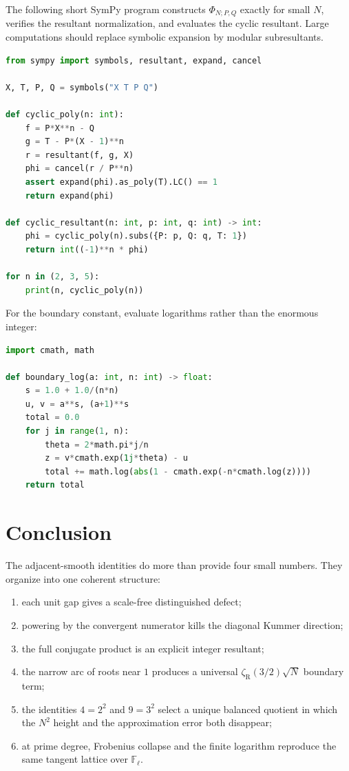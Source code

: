 \documentclass[11pt]{article}
\theoremstyle{definition}
\theoremstyle{remark}
\newcommand{\FF}{\mathbb F}
\newcommand{\zR}{\zeta_{\!\mathrm R}}
\begin{document}
The following short SymPy program constructs \(\Phi_{N;P,Q}\) exactly for small \(N\), verifies the resultant normalization, and evaluates the cyclic resultant.  Large computations should replace symbolic expansion by modular subresultants.

\begin{lstlisting}[language=Python,basicstyle=\ttfamily\small,frame=single,breaklines=true,showstringspaces=false]
from sympy import symbols, resultant, expand, cancel

X, T, P, Q = symbols("X T P Q")

def cyclic_poly(n: int):
    f = P*X**n - Q
    g = T - P*(X - 1)**n
    r = resultant(f, g, X)
    phi = cancel(r / P**n)
    assert expand(phi).as_poly(T).LC() == 1
    return expand(phi)

def cyclic_resultant(n: int, p: int, q: int) -> int:
    phi = cyclic_poly(n).subs({P: p, Q: q, T: 1})
    return int((-1)**n * phi)

for n in (2, 3, 5):
    print(n, cyclic_poly(n))
\end{lstlisting}

For the boundary constant, evaluate logarithms rather than the enormous integer:
\begin{lstlisting}[language=Python,basicstyle=\ttfamily\small,frame=single,breaklines=true,showstringspaces=false]
import cmath, math

def boundary_log(a: int, n: int) -> float:
    s = 1.0 + 1.0/(n*n)
    u, v = a**s, (a+1)**s
    total = 0.0
    for j in range(1, n):
        theta = 2*math.pi*j/n
        z = v*cmath.exp(1j*theta) - u
        total += math.log(abs(1 - cmath.exp(-n*cmath.log(z))))
    return total
\end{lstlisting}

\section{Conclusion}

The adjacent-smooth identities do more than provide four small numbers.  They organize into one coherent structure:
\begin{enumerate}
\item each unit gap gives a scale-free distinguished defect;
\item powering by the convergent numerator kills the diagonal Kummer direction;
\item the full conjugate product is an explicit integer resultant;
\item the narrow arc of roots near \(1\) produces a universal \(\zR(3/2)\sqrt N\) boundary term;
\item the identities \(4=2^2\) and \(9=3^2\) select a unique balanced quotient in which the \(N^2\) height and the approximation error both disappear;
\item at prime degree, Frobenius collapse and the finite logarithm reproduce the same tangent lattice over \(\FF_\ell\).
\end{enumerate}
\end{document}
